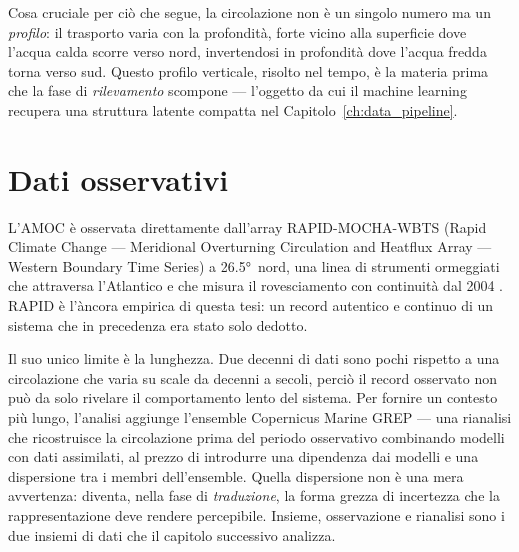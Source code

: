 Cosa cruciale per ciò che segue, la circolazione non è un singolo numero ma un \emph{profilo}: il trasporto varia con la profondità, forte vicino alla superficie dove l'acqua calda scorre verso nord, invertendosi in profondità dove l'acqua fredda torna verso sud. Questo profilo verticale, risolto nel tempo, è la materia prima che la fase di \emph{rilevamento} scompone --- l'oggetto da cui il machine learning recupera una struttura latente compatta nel Capitolo~\ref{ch:data_pipeline}.

\section{Dati osservativi}
\label{sec:bg-data}

L'AMOC è osservata direttamente dall'array RAPID-MOCHA-WBTS (Rapid Climate Change --- Meridional Overturning Circulation and Heatflux Array --- Western Boundary Time Series) a \ang{26.5}~nord, una linea di strumenti ormeggiati che attraversa l'Atlantico e che misura il rovesciamento con continuità dal 2004 \citep{frajkawilliams2021, moat2026}. RAPID è l'àncora empirica di questa tesi: un record autentico e continuo di un sistema che in precedenza era stato solo dedotto.

Il suo unico limite è la lunghezza. Due decenni di dati sono pochi rispetto a una circolazione che varia su scale da decenni a secoli, perciò il record osservato non può da solo rivelare il comportamento lento del sistema. Per fornire un contesto più lungo, l'analisi aggiunge l'ensemble Copernicus Marine GREP --- una rianalisi che ricostruisce la circolazione prima del periodo osservativo combinando modelli con dati assimilati, al prezzo di introdurre una dipendenza dai modelli e una dispersione tra i membri dell'ensemble. Quella dispersione non è una mera avvertenza: diventa, nella fase di \emph{traduzione}, la forma grezza di incertezza che la rappresentazione deve rendere percepibile. Insieme, osservazione e rianalisi sono i due insiemi di dati che il capitolo successivo analizza.
